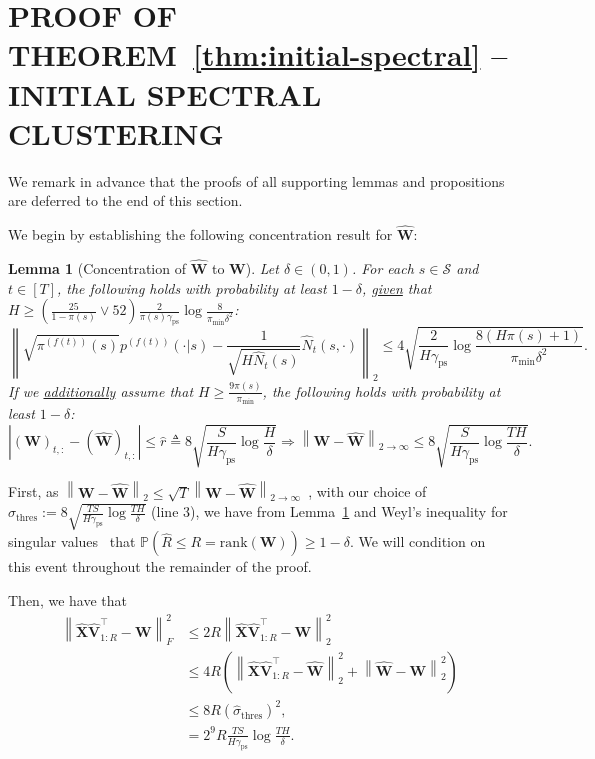 \documentclass[twoside]{article}
\def\mV{{\bm{V}}}
\def\mW{{\bm{W}}}
\def\mX{{\bm{X}}}
\def\gS{{\mathcal{S}}}
\def\sP{{\mathbb{P}}}
\theoremstyle{plain}
\newtheorem{lemma}{Lemma}[section]
\newcommand{\rank}{\mathrm{rank}}
\def\bignorm#1{\left\lVert #1 \right\rVert}
\def\bigabs#1{\left| #1 \right|}
\newcommand{\ps}{\mathrm{ps}}
\newcommand{\thres}{\mathrm{thres}}
\begin{document}
\section{\texorpdfstring{PROOF OF THEOREM~\ref{thm:initial-spectral} -- INITIAL SPECTRAL CLUSTERING}{PROOF OF THEOREM 4.1 -- INITIAL SPECTRAL CLUSTERING}}
\label{app:initial-spectral}
We remark in advance that the proofs of all supporting lemmas and propositions are deferred to the end of this section.

We begin by establishing the following concentration result for $\widehat{\mW}$:
\begin{lemma}[Concentration of $\widehat{\mW}$ to $\mW$]
\label{lem:concentration-W}
    Let $\delta \in (0, 1)$.
    For each $s \in \gS$ and $t \in [T]$, the following holds with probability at least $1 - \delta$, \underline{given} that $H \geq \left( \frac{25}{1 - \pi(s)} \vee 52 \right) \frac{2}{\pi(s) \gamma_\ps} \log\frac{8}{\pi_{\min} \delta^2}$:
    \begin{equation}
        \bignorm{\sqrt{\pi^{(f(t))}(s)} p^{(f(t))}(\cdot | s) - \frac{1}{\sqrt{H \widehat{N}_t(s)}} \widehat{N}_t(s, \cdot)}_2 \leq
        4 \sqrt{\frac{2}{H \gamma_\ps} \log\frac{8 (H \pi(s) + 1)}{\pi_{\min} \delta^2}}.
    \end{equation}
    If we \underline{additionally} assume that $H \geq \frac{9 \pi(s)}{\pi_{\min}}$, the following holds with probability at least $1 - \delta$:
    \begin{equation}
        \bigabs{(\mW)_{t,:} - (\widehat{\mW})_{t,:}} \leq \widehat{r} \triangleq 8 \sqrt{\frac{S}{H \gamma_\ps} \log\frac{H}{\delta}}
        \Longrightarrow
        \bignorm{\mW - \widehat{\mW}}_{2 \rightarrow \infty} \leq 8 \sqrt{\frac{S}{H \gamma_\ps} \log\frac{T H}{\delta}}.
    \end{equation}
\end{lemma}

First, as $\bignorm{\mW - \widehat{\mW}}_2 \leq \sqrt{T} \bignorm{\mW - \widehat{\mW}}_{2 \rightarrow \infty}$~\citep[Proposition 6.3]{cape2019twoinfty}, with our choice of $\widehat{\sigma}_\thres := 8 \sqrt{\frac{T S}{H \gamma_\ps} \log\frac{T H}{\delta}}$ (line 3), we have from Lemma~\ref{lem:concentration-W} and Weyl's inequality for singular values~\citep[Problem 7.3.P16]{hornjohnson} that $\sP\left( \widehat{R} \leq R = \rank(\mW) \right) \geq 1 - \delta$.
We will condition on this event throughout the remainder of the proof.

Then, we have that
\begin{align*}
    \bignorm{\widehat{\mX} \widehat{\mV}_{1:R}^\top - \mW}_F^2 &\leq 2 R \bignorm{\widehat{\mX} \widehat{\mV}_{1:R}^\top - \mW}_2^2 \\
    &\leq 4 R \left( \bignorm{\widehat{\mX} \widehat{\mV}_{1:R}^\top - \widehat{\mW}}_2^2 + \bignorm{\widehat{\mW} - \mW}_2^2 \right) \\
    &\leq 8 R (\widehat{\sigma}_{\thres})^2 \tag{with probability at least $1 - \delta$}, \\
    &= 2^9 R \frac{TS}{H \gamma_\ps} \log\frac{TH}{\delta}.
\end{align*}
\end{document}
